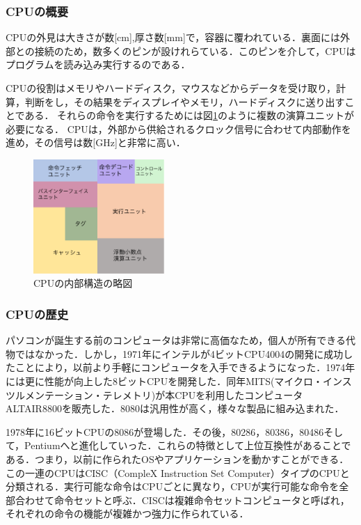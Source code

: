 \documentclass[a4j,12pt]{jsarticle}
\begin{document}
\subsubsection{CPUの概要}
CPUの外見は大きさが数[cm],厚さ数[mm]で，容器に覆われている．裏面には外部との接続のため，数多くのピンが設けれらている．このピンを介して，CPUはプログラムを読み込み実行するのである．

CPUの役割はメモリやハードディスク，マウスなどからデータを受け取り，計算，判断をし，その結果をディスプレイやメモリ，ハードディスクに送り出すことである．
それらの命令を実行するためには図\ref{fig:cpu}のように複数の演算ユニットが必要になる．
CPUは，外部から供給されるクロック信号に合わせて内部動作を進め，その信号は数[GHz]と非常に高い．

\begin{figure}[htbp]
 \begin{center}
  \includegraphics[width=50mm]{CPU.pdf}
 \end{center}
 \caption{CPUの内部構造の略図}
 \label{fig:cpu}
\end{figure}

\subsubsection{CPUの歴史}
パソコンが誕生する前のコンピュータは非常に高価なため，個人が所有できる代物ではなかった．しかし，1971年にインテルが4ビットCPU4004の開発に成功したことにより，以前より手軽にコンピュータを入手できるようになった．1974年には更に性能が向上した8ビットCPUを開発した．同年MITS(マイクロ・インスツルメンテーション・テレメトリ)が本CPUを利用したコンピュータALTAIR8800を販売した．8080は汎用性が高く，様々な製品に組み込まれた．

1978年に16ビットCPUの8086が登場した．その後，80286，80386，80486そして，Pentiumへと進化していった．これらの特徴として上位互換性があることである．つまり，以前に作られたOSやアプリケーションを動かすことができる．この一連のCPUはCISC（CompleX Instruction Set Computer）タイプのCPUと分類される．実行可能な命令はCPUごとに異なり，CPUが実行可能な命令を全部合わせて命令セットと呼ぶ．CISCは複雑命令セットコンピュータと呼ばれ，それぞれの命令の機能が複雑かつ強力に作られている．
\end{document}
